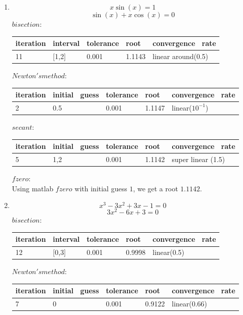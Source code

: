 \documentclass[11pt,twoside]{article}
\begin{document}
\begin{enumerate}[leftmargin=0pt]
\begin{enumerate}
	\item \[x\sin(x) = 1\]
		 \[\sin(x) + x\cos(x) = 0\]
		$bisection: $
		 \begin{longtable}{|>{\tiny}p{0.5in}|>{\tiny} p{0.5in}| >{\tiny}p{0.5in}|>{\tiny}p{0.5in}|	
		 	>{\tiny} p{0.8in}|}\hline
			iteration&interval&tolerance&root&convergence \ rate \\[0.1in]\hline
			11 &[1,2]&0.001&1.1143&linear around(0.5)\\[0.1in] \hline
		\end{longtable} 
		$Newton's method:$
		 \begin{longtable}{|>{\tiny}p{0.5in}|>{\tiny} p{0.5in}| >{\tiny}p{0.5in}|>{\tiny}p{0.5in}|	
		 	>{\tiny} p{0.8in}|}\hline
			iteration&initial \ guess&tolerance&root&convergence \ rate \\[0.1in]\hline
			2 &0.5&0.001&1.1147&linear($10^{-1}$)\\[0.1in] \hline
		\end{longtable} 
		$secant:$
		\begin{longtable}{|>{\tiny}p{0.5in}|>{\tiny} p{0.5in}| >{\tiny}p{0.5in}|>{\tiny}p{0.5in}|	
		 	>{\tiny} p{0.8in}|}\hline
			iteration&initial \ guess&tolerance&root&convergence \ rate \\[0.1in]\hline
			5 &1,2&0.001&1.1142&super linear (1.5)\\[0.1in] \hline
		\end{longtable} 
		$fzero:$ \\
		Using matlab  $fzero$ with initial guess $1$, we get a root $1.1142$.
	\item \[x^3 -3x^2 +3x -1 = 0\]
		 \[3x^2 -6x + 3 = 0\]
		$bisection: $
		 \begin{longtable}{|>{\tiny}p{0.5in}|>{\tiny} p{0.5in}| >{\tiny}p{0.5in}|>{\tiny}p{0.5in}|	
		 	>{\tiny} p{0.8in}|}\hline
			iteration&interval&tolerance&root&convergence \ rate \\[0.1in]\hline
			12 &[0,3]&0.001&0.9998& linear(0.5)\\[0.1in] \hline
		\end{longtable} 
		$Newton's method:$
		 \begin{longtable}{|>{\tiny}p{0.5in}|>{\tiny} p{0.5in}| >{\tiny}p{0.5in}|>{\tiny}p{0.5in}|	
		 	>{\tiny} p{0.8in}|}\hline
			iteration&initial \ guess&tolerance&root&convergence \ rate \\[0.1in]\hline
			7 &0&0.001&0.9122&linear(0.66)\\[0.1in] \hline
		\end{longtable} 

\end{enumerate}
\end{enumerate}
\end{document}
